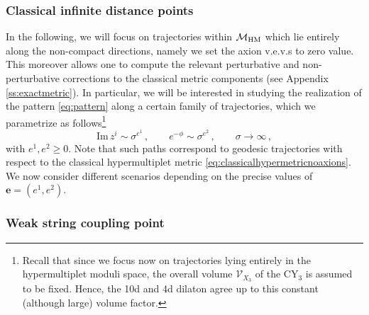 	
\subsubsection{Classical infinite distance points}
\label{sss:classivalvsquantum}
	
In the following, we will focus on trajectories within $\mathcal{M}_{\rm HM}$ which lie entirely along the non-compact directions, namely we set the axion v.e.v.s to zero value. This moreover allows one to compute the relevant perturbative and non-perturbative corrections to the classical metric components \cite{Marchesano:2019ifh,Baume:2019sry} (see Appendix \ref{ss:exactmetric}). In particular, we will be interested in studying the realization of the pattern \eqref{eq:pattern} along a certain family of trajectories, which we parametrize as follows\footnote{Recall that since we focus now on trajectories lying entirely in the hypermultiplet moduli space, the overall volume $\mathcal{V}_{X_3}$ of the CY$_3$ is assumed to be fixed. Hence, the 10d and 4d dilaton agree up to this constant (although large) volume factor.}
%
\begin{equation}\label{eq:generictraj}
	\text{Im}\, z^i \sim \sigma^{e^1}\, , \qquad e^{-\phi}\sim \sigma^{e^2}\, , \qquad \sigma \to \infty\, ,
\end{equation}
%
with $e^1, e^2 \geq 0$. Note that such paths correspond to geodesic trajectories with respect to the classical hypermultiplet metric \eqref{eq:classicalhypermetricnoaxions}. We now consider different scenarios depending on the precise values of $\mathbf{e}=(e^1, e^2)$.
	
\subsubsection*{Weak string coupling point}
	
